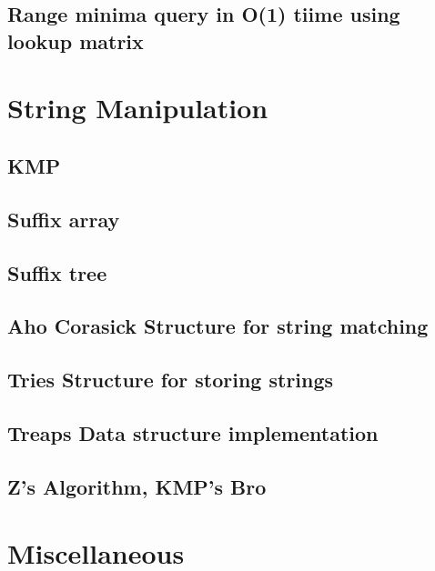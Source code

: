 \subsection{Range minima query in O(1) tiime using lookup matrix}
\raggedbottom
\hrulefill

\section{String Manipulation}
\subsection{KMP}
\raggedbottom
\hrulefill
\subsection{Suffix array}
\raggedbottom
\hrulefill
\subsection{Suffix tree}
\raggedbottom
\hrulefill
\subsection{Aho Corasick Structure for string matching}
\raggedbottom
\hrulefill
\subsection{Tries Structure for storing strings}
\raggedbottom
\hrulefill
\subsection{Treaps Data structure implementation}
\raggedbottom
\hrulefill
\subsection{Z's Algorithm, KMP's Bro}
\raggedbottom
\hrulefill

\section{Miscellaneous}
